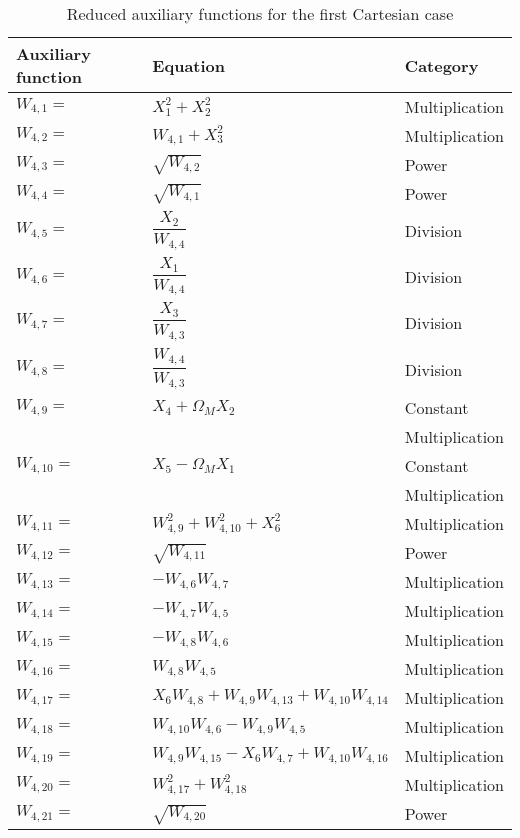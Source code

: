 \begin{longtable}{|p{1.5cm}|l|p{2cm}|}
\caption{Reduced auxiliary functions for the first Cartesian case}
\label{tab:auxFunc1}
\endfirsthead
\endhead
\hline
\textbf{Auxiliary function} & \textbf{Equation} & \textbf{Category}  \\ \hline \hline
\hline 
$W_{4,1}=$ & $ X_{1}^{2}+X_{2}^{2} $ & Multiplication \\ \hline
$W_{4,2}=$ & $ W_{4,1}+X_{3}^{2} $ & Multiplication \\ \hline
$W_{4,3}=$ & $ \sqrt{W_{4,2}} $ & Power \\ \hline
$W_{4,4}=$ & $ \sqrt{W_{4,1}} $ & Power \\ \hline
$W_{4,5}=$ & $ \dfrac{X_{2}}{W_{4,4}} $ & Division \\ \hline
$W_{4,6}=$ & $ \dfrac{X_{1}}{W_{4,4}} $ & Division \\ \hline
$W_{4,7}=$ & $ \dfrac{X_{3}}{W_{4,3}} $ & Division \\ \hline
$W_{4,8}=$ & $ \dfrac{W_{4,4}}{W_{4,3}} $ & Division \\ \hline
$W_{4,9}=$ & $ X_{4}+\Omega_{M}X_{2} $ & Constant  \\ 
& & Multiplication \\ \hline
$W_{4,10}=$ & $ X_{5}-\Omega_{M}X_{1} $ & Constant  \\ 
& & Multiplication \\ \hline
$W_{4,11}=$ & $ W_{4,9}^{2}+W_{4,10}^{2}+X_{6}^{2} $ & Multiplication \\ \hline
$W_{4,12}=$ & $ \sqrt{W_{4,11}} $ & Power \\ \hline
$W_{4,13}=$ & $ -W_{4,6}W_{4,7} $ & Multiplication \\ \hline
$W_{4,14}=$ & $ -W_{4,7}W_{4,5} $ & Multiplication \\ \hline
$W_{4,15}=$ & $ -W_{4,8}W_{4,6} $ & Multiplication \\ \hline
$W_{4,16}=$ & $ W_{4,8}W_{4,5} $ & Multiplication \\ \hline
$W_{4,17}=$ & $ X_{6}W_{4,8}+W_{4,9}W_{4,13}+W_{4,10}W_{4,14} $ & Multiplication \\ \hline
$W_{4,18}=$ & $ W_{4,10}W_{4,6}-W_{4,9}W_{4,5} $ & Multiplication \\ \hline
$W_{4,19}=$ & $ W_{4,9}W_{4,15}-X_{6}W_{4,7}+W_{4,10}W_{4,16} $ & Multiplication \\ \hline
$W_{4,20}=$ & $ W_{4,17}^{2}+W_{4,18}^{2} $ & Multiplication \\ \hline
$W_{4,21}=$ & $ \sqrt{W_{4,20}} $ & Power \\ \hline

\end{longtable}
